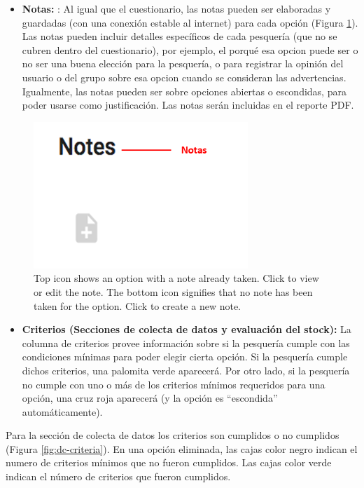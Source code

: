 \documentclass[
  11pt,
]{book}
\providecommand{\tightlist}{%
  \setlength{\itemsep}{0pt}\setlength{\parskip}{0pt}}
\begin{document}
\begin{itemize}
\tightlist
\item
  \textbf{Notas:} : Al igual que el cuestionario, las notas pueden ser elaboradas y guardadas (con una conexión estable al internet) para cada opción (Figura \ref{fig:notes}). Las notas pueden incluir detalles específicos de cada pesquería (que no se cubren dentro del cuestionario), por ejemplo, el porqué esa opcion puede ser o no ser una buena elección para la pesquería, o para registrar la opinión del usuario o del grupo sobre esa opcion cuando se consideran las advertencias. Igualmente, las notas pueden ser sobre opciones abiertas o escondidas, para poder usarse como justificación. Las notas serán incluidas en el reporte PDF.
\end{itemize}

\begin{figure}

{\centering \includegraphics[width=0.15\linewidth]{images/notes-es} 

}

\caption{Top icon shows an option with a note already taken. Click to view or edit the note. The bottom icon signifies that no note has been taken for the option. Click to create a new note.}\label{fig:notes}
\end{figure}

\begin{itemize}
\tightlist
\item
  \textbf{Criterios (Secciones de colecta de datos y evaluación del stock):} La columna de criterios provee información sobre si la pesquería cumple con las condiciones mínimas para poder elegir cierta opción. Si la pesquería cumple dichos criterios, una palomita verde aparecerá. Por otro lado, si la pesquería no cumple con uno o más de los criterios mínimos requeridos para una opción, una cruz roja aparecerá (y la opción es ``escondida'' automáticamente).
\end{itemize}

Para la sección de colecta de datos los criterios son cumplidos o no cumplidos (Figura \ref{fig:dc-criteria}). En una opción eliminada, las cajas color negro indican el numero de criterios mínimos que no fueron cumplidos. Las cajas color verde indican el número de criterios que fueron cumplidos.
\end{document}
